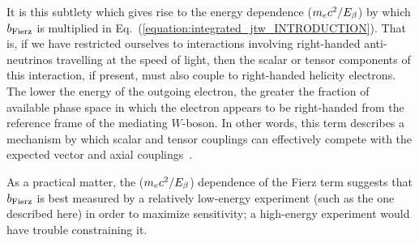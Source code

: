 It is this subtlety which gives rise to the energy dependence ($m_e c^2 / E_{\beta} $) by which $b_{\mathrm{Fierz}}$ is multiplied in Eq.~(\ref{equation:integrated_jtw_INTRODUCTION}).  
That is, if we have restricted ourselves to interactions involving right-handed anti-neutrinos travelling at the speed of light, then the scalar or tensor components of this interaction, if present, must also couple to right-handed helicity electrons.  The lower the energy of the outgoing electron, the greater the fraction of available phase space in which the electron appears to be right-handed from the reference frame of the mediating $W$-boson.  In other words, this term describes a mechanism by which scalar and tensor couplings can effectively compete with the expected vector and axial couplings~\cite{hong_sternberg_garcia}\cite{Greiner2009}.

As a practical matter, the ($m_e c^2 / E_{\beta} $) dependence of the Fierz term suggests that $b_{\mathrm{Fierz}}$ is best measured by a relatively low-energy experiment (such as the one described here) in order to maximize sensitivity;  a high-energy experiment would have trouble constraining it.



